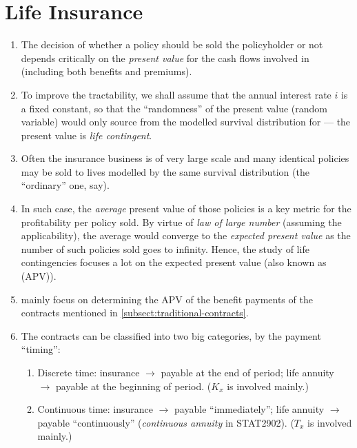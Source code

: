 \section{Life Insurance}
\label{sect:life-insurance}
\begin{enumerate}
\item The decision of whether a policy  should be sold the
policyholder  or not depends critically on the \emph{present
value} for the cash flows involved in  (including both
benefits and premiums).
\item To improve the tractability, we shall assume that the annual interest
rate \(i\) is a fixed constant, so that the ``randomness'' of the present value
(random variable) would only source from the modelled survival distribution for
 --- the present value is \emph{life contingent}.
\item Often the insurance business  is of very
large scale and many identical policies may be sold to lives modelled by the
same survival distribution (the ``ordinary'' one, say).

\item In such case, the \emph{average} present value of those policies is a key
metric for the profitability per policy sold. By virtue of \emph{ law of large
number} (assuming the applicability), the average would converge to the
\emph{expected present value} as the number of such policies sold goes to
infinity. Hence, the study of life contingencies focuses a lot on the expected
present value (also known as  (APV)).

\item {} mainly focus on determining
the APV of the benefit payments of the contracts mentioned in
\cref{subsect:traditional-contracts}.
\item The contracts can be classified into two big categories, by the payment
``timing'':
\begin{enumerate}
\item Discrete time: insurance \(\rightarrow\) payable at the end of period;
life annuity \(\rightarrow\) payable at the beginning of period. (\(K_x\) is
involved mainly.)
\item Continuous time: insurance \(\rightarrow\) payable ``immediately''; life
annuity \(\rightarrow\) payable ``continuously'' (\emph{continuous annuity} in
STAT2902). (\(T_x\) is involved mainly.)
\end{enumerate}


\end{enumerate}
